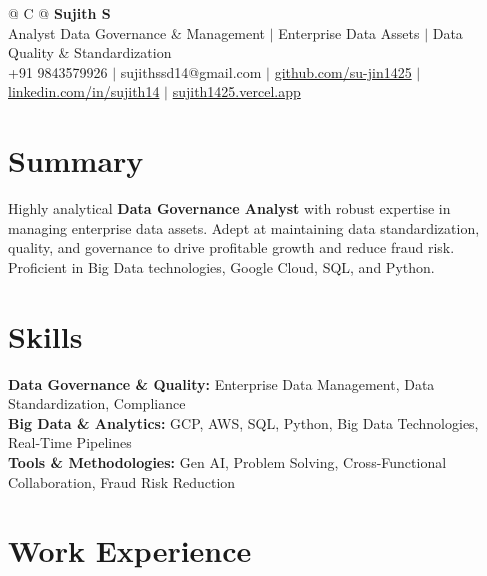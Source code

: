 \documentclass[a4paper,10pt]{article}
\newcommand{\ulink}[2]{\href{#1}{#2}}
\begin{document}
\pagestyle{empty}

\begin{tabularx}{\linewidth}{@{} C @{}}
{\color[HTML]{000000}\fontsize{30}{35}\selectfont\bfseries Sujith S} \\[5pt]
{\fontsize{10.5}{12.5}\selectfont\color[HTML]{3A3A3A}
Analyst Data Governance \& Management $|$ Enterprise Data Assets $|$ Data Quality \& Standardization} \\[6pt]
{\fontsize{9.5}{11.5}\selectfont\textcolor[HTML]{3A3A3A}{+91 9843579926 $|$ sujithssd14@gmail.com $|$ \ulink{https://github.com/su-jin1425}{github.com/su-jin1425} $|$ \ulink{https://linkedin.com/in/sujith14}{linkedin.com/in/sujith14} $|$ \ulink{https://sujith1425.vercel.app}{sujith1425.vercel.app}}}
\end{tabularx}

\section{Summary}
\vspace{2pt}

{\color[HTML]{0A0A0A}\fontsize{11}{14}\selectfont
Highly analytical \textbf{Data Governance Analyst} with robust expertise in managing enterprise data assets. Adept at maintaining data standardization, quality, and governance to drive profitable growth and reduce fraud risk. Proficient in Big Data technologies, Google Cloud, SQL, and Python.}

\section{Skills}
\vspace{2pt}

{\color[HTML]{0A0A0A}\fontsize{11}{14}\selectfont
\textbf{Data Governance \& Quality:} Enterprise Data Management, Data Standardization, Compliance \\[2pt]
\textbf{Big Data \& Analytics:} GCP, AWS, SQL, Python, Big Data Technologies, Real-Time Pipelines \\[2pt]
\textbf{Tools \& Methodologies:} Gen AI, Problem Solving, Cross-Functional Collaboration, Fraud Risk Reduction}

\section{Work Experience}
\vspace{2pt}
\end{document}
